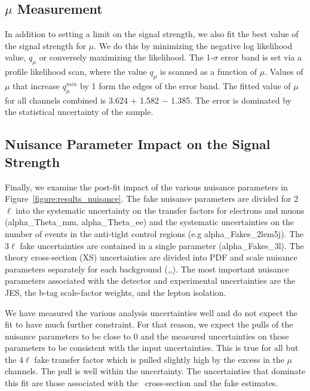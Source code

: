 \subsection{$\mu$ Measurement}

In addition to setting a limit on the signal strength, we also fit the best value of the signal strength for $\mu$. We do this by minimizing the negative log likelihood value, $q_{\mu}$ or conversely maximizing the likelihood. The 1-$\sigma$ error band is set via a profile likelihood scan, where the value $q_{\mu}$ is scanned as a function of $\mu$. Values of $\mu$ that increase $q^{min}_{\mu}$ by 1 form the edges of the error band. The fitted value of $\mu$ for all channels combined is 3.624 $+$ 1.582 $-$ 1.385. The error is dominated by the statistical uncertainty of the sample. 


\subsection{Nuisance Parameter Impact on the Signal Strength}

Finally, we examine the post-fit impact of the various nuisance parameters in Figure~\ref{figure:results_nuisance}.  The fake nuisance parameters are divided for 2$\ell$ into the systematic uncertainty on the transfer factors for electrons and muons (alpha\_Theta\_mm, alpha\_Theta\_ee) and the systematic uncertainties on the number of events in the anti-tight control regions (e.g alpha\_Fakes\_2lem5j). The 3$\ell$ fake uncertainties are contained in a single parameter (alpha\_Fakes\_3l). The theory cross-section (XS) uncertainties are divided into PDF and scale nuisance parameters separately for each background (\ttW,\ttZ,\tth). The most important nuisance parameters associated with the detector and experimental uncertainties are the JES, the b-tag scale-factor weights, and the lepton isolation.  

We have measured the various analysis uncertainties well and do not expect the fit to have much further constraint. For that reason, we expect the pulls of the nuisance parameters to be close to 0 and the measured uncertainties on those parameters to be consistent with the input uncertainties. This is true for all but the 4$\ell$ fake transfer factor which is pulled slightly high by the excess in the $\mu$ channels. The pull is well within the uncertainty. The uncertainties that dominate this fit are those associated with the \ttV\ cross-section and the fake estimates. 


